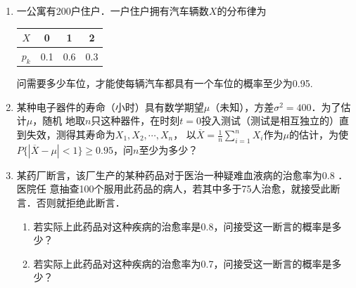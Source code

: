 \begin{enumerate}
    \item 一公寓有200户住户．一户住户拥有汽车辆数$X$的分布律为
    \begin{table}[H]\centering
    \begin{tabular}{c|ccc}
    $X$   & 0 & 1   & 2   \\ \hline
    $p_k$ & 0.1  & 0.6 & 0.3
    \end{tabular}
    \end{table}
    \vspace{-0.5cm}
    问需要多少车位，才能使每辆汽车都具有一个车位的概率至少为0.95.


    \item 某种电子器件的寿命（小时）具有数学期望$\mu$（未知），方差$\sigma^2=400$．为了估计$\mu$，随机
    地取$n$只这种器件，在时刻$t=0$投入测试（测试是相互独立的）直到失效，测得其寿命为$X_1,X_2,\cdots,X_n$，
    以$\displaystyle{\overline{X}=\frac{1}{n}\sum_{i=1}^n X_i}$作为$\mu$的估计，为使
    $P\{|\overline{X}-\mu|<1\}\geq 0.95$，问$n$至少为多少？

    \item 某药厂断言，该厂生产的某种药品对于医治一种疑难血液病的治愈率为0.8 ．医院任
    意抽查100个服用此药品的病人，若其中多于75人治愈，就接受此断言．否则就拒绝此断言．
    \begin{enumerate}
        \item 若实际上此药品对这种疾病的治愈率是0.8，问接受这一断言的概率是多少？
        \item 若实际上此药品对这种疾病的治愈率为0.7，问接受这一断言的概率是多少？
    \end{enumerate}

    

    


  

\end{enumerate}
